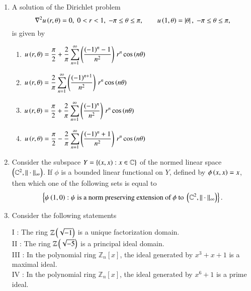 \documentclass[journal,12pt,onecolumn]{IEEEtran}
\theoremstyle{remark}
\begin{document}
\begin{enumerate}[start=1, label=Q.\arabic*]
\item A solution of the Dirichlet problem
\[
\nabla^2 u\left(r,\theta\right)=0,\; 0<r<1,\; -\pi \le \theta \le \pi,\qquad
u\left(1,\theta\right)=\left\vert\theta\right\vert,\; -\pi \le \theta \le \pi,
\]
is given by
\begin{enumerate}
\item $u\left(r,\theta\right)=\dfrac{\pi}{2}+\dfrac{2}{\pi}\displaystyle\sum_{n=1}^{\infty}
\left(\dfrac{(-1)^n-1}{n^2}\right)\, r^{n}\cos\left(n\theta\right)$
\item $u\left(r,\theta\right)=\dfrac{2}{\pi}\displaystyle\sum_{n=1}^{\infty}
\left(\dfrac{(-1)^{n+1}}{n^2}\right)\, r^{n}\cos\left(n\theta\right)$
\item $u\left(r,\theta\right)=\dfrac{\pi}{2}+\dfrac{2}{\pi}\displaystyle\sum_{n=1}^{\infty}
\left(\dfrac{(-1)^n}{n^2}\right)\, r^{n}\cos\left(n\theta\right)$
\item $u\left(r,\theta\right)=\dfrac{\pi}{2}-\dfrac{2}{\pi}\displaystyle\sum_{n=1}^{\infty}
\left(\dfrac{(-1)^n+1}{n^2}\right)\, r^{n}\cos\left(n\theta\right)$
\end{enumerate}

\hfill{}


\item Consider the subspace $Y=\{\left(x,x\right): x\in \mathbb{C}\}$ of the normed linear space $\left(\mathbb{C}^2,\|\cdot\|_{\infty}\right)$.  
If $\phi$ is a bounded linear functional on $Y$, defined by $\phi\left(x,x\right)=x$, then which one of the following sets is equal to
\[
\left\{\psi\left(1,0\right): \psi \text{ is a norm preserving extension of }\phi \text{ to } \left(\mathbb{C}^2,\|\cdot\|_{\infty}\right)\right\}.
\]
\begin{enumerate}
\begin{multicols}{2}
\item $\{1\}$
\item $\left[\dfrac{1}{2},\, \dfrac{3}{2}\right]$
\item $\brak{[1,\infty)}$
\item $\brak{[0,1]}$
\end{multicols}
\end{enumerate}

\hfill{}
\item Consider the following statements\brak{:}

I : The ring $\mathbb{Z}\left(\sqrt{-1}\right)$ is a unique factorization domain.\\
II : The ring $\mathbb{Z}\left(\sqrt{-5}\right)$ is a principal ideal domain.\\
III : In the polynomial ring $\mathbb{Z}_n[x]$, the ideal generated by $x^3 + x + 1$ is a maximal ideal.\\
IV : In the polynomial ring $\mathbb{Z}_n[x]$, the ideal generated by $x^6 + 1$ is a prime ideal.\\


\end{enumerate}
\end{document}
